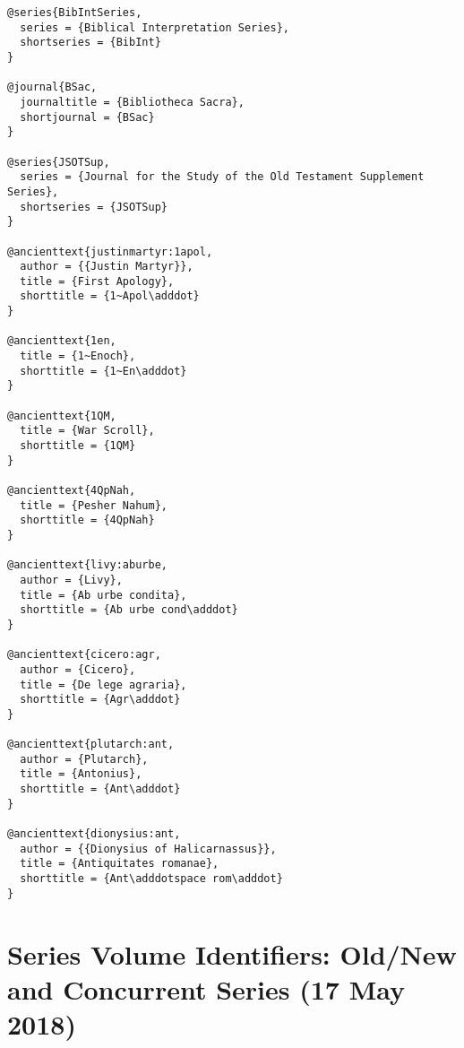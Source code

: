 \documentclass[a4paper]{article}
\begin{document}
\begin{verbatim}
@series{BibIntSeries,
  series = {Biblical Interpretation Series},
  shortseries = {BibInt}
}

@journal{BSac,
  journaltitle = {Bibliotheca Sacra},
  shortjournal = {BSac}
}

@series{JSOTSup,
  series = {Journal for the Study of the Old Testament Supplement Series},
  shortseries = {JSOTSup}
}

@ancienttext{justinmartyr:1apol,
  author = {{Justin Martyr}},
  title = {First Apology},
  shorttitle = {1~Apol\adddot}
}

@ancienttext{1en,
  title = {1~Enoch},
  shorttitle = {1~En\adddot}
}

@ancienttext{1QM,
  title = {War Scroll},
  shorttitle = {1QM}
}

@ancienttext{4QpNah,
  title = {Pesher Nahum},
  shorttitle = {4QpNah}
}

@ancienttext{livy:aburbe,
  author = {Livy},
  title = {Ab urbe condita},
  shorttitle = {Ab urbe cond\adddot}
}

@ancienttext{cicero:agr,
  author = {Cicero},
  title = {De lege agraria},
  shorttitle = {Agr\adddot}
}

@ancienttext{plutarch:ant,
  author = {Plutarch},
  title = {Antonius},
  shorttitle = {Ant\adddot}
}

@ancienttext{dionysius:ant,
  author = {{Dionysius of Halicarnassus}},
  title = {Antiquitates romanae},
  shorttitle = {Ant\adddotspace rom\adddot}
}
\end{verbatim}

\begin{verbcite}
  \nocite{AB, ABD, philo:abr, philo:agr, tacitus:ann, graniuslicinianus:ann,
    AJSL, atlantis, AzTh, BibIntSeries, BibInt, BSac, JSOTSup,
    justinmartyr:1apol, 1en, 1QM, 4QpNah, livy:aburbe, cicero:agr,
    plutarch:ant, dionysius:ant}
\end{verbcite}
\exampleancientsources
\examplesecondarysources
{}

\section{Series Volume Identifiers: Old/New and Concurrent Series (17 May 2018)}
\end{document}
